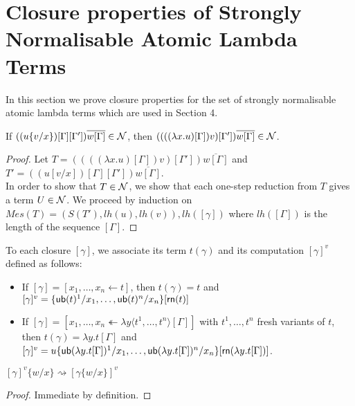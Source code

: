 \documentclass[orivec]{llncs}
\begin{document}
\section{Closure properties of Strongly Normalisable Atomic Lambda Terms}\label{sec:ClosPropSN}


In this section we prove closure properties for the set of strongly normalisable atomic lambda terms
which are used in Section 4.

\begin{ALlemma}\label{lem:IntCaseLambda0}
If $((u\{v/x\})[\Gamma][\Gamma'])\overline{w[\Gamma]} \in \mathcal{N}$, then $((((\lambda x.u)[\Gamma]) v)[\Gamma'])\overline{w[\Gamma]} \in \mathcal{N}$.
\end{ALlemma}

\begin{proof}
 Let $T = ((((\lambda x.u)[\Gamma]) v)[\Gamma'])\overline{w[\Gamma]}$ and $T' = ((u[v/x])[\Gamma][\Gamma'])\overline{w[\Gamma]}$.
\\
In order to show that $T\in\mathcal{N}$, we show that each one-step reduction from $T$ gives a term $U\in\mathcal{N}$.
%
We proceed by induction on $Mes(T) = (S(T'), lh(u), lh(v)), lh([\gamma])$ where
 $lh([\Gamma])$ is the length of the sequence $[\Gamma]$.
\end{proof}

\newcommand{\term}{{\mathsf{t}}}

To each closure $[\gamma]$, we associate its term $t(\gamma)$ and its computation $[\gamma]^v $ defined as follows:
\begin{itemize}
 \item If $[\gamma] = [x_1,\dots,x_n \leftarrow t]$, then $t(\gamma) = t$  and $[\gamma]^v = \{{\mathsf{ub}}(t)^1/x_1,\dots,{\mathsf{ub}}(t)^n/x_n\}[{\mathsf{rn}} (t)]$
 \item If $[\gamma] = [x_1,\dots,x_n \twoheadleftarrow \lambda y\langle t^1,\dots,t^n \rangle[\Gamma]]$ with $t^1,\dots,t^n$  fresh variants of $t$, then  $t(\gamma) = \lambda y.t[\Gamma]$  and $[\gamma]^v = u\{{\mathsf{ub}}(\lambda y.t[\Gamma])^1/x_1,\dots,{\mathsf{ub}}(\lambda y.t[\Gamma])^n/x_n\}[{\mathsf{rn}} (\lambda y.t[\Gamma])]$.
\end{itemize}

\begin{ALlemma}\label{lem:CompSubst}
 $[\gamma]^v \{w/x\} \rightsquigarrow [\gamma\{w/x\} ]^v$
\end{ALlemma}

\begin{proof}
Immediate by definition.
\end{proof}
\end{document}
